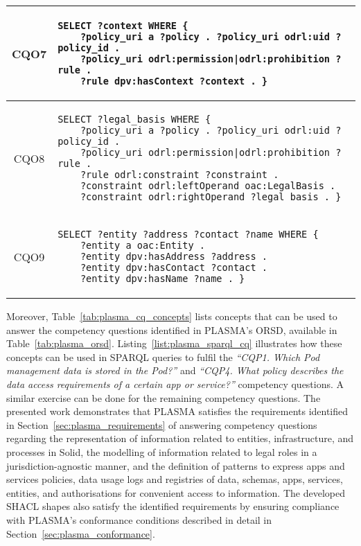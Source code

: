 \begin{table}[htp]
\begin{tabular}{c||l}
        CQO7 & \begin{lstlisting}[numbers=none]
SELECT ?context WHERE {
    ?policy_uri a ?policy . ?policy_uri odrl:uid ?policy_id . 
    ?policy_uri odrl:permission|odrl:prohibition ?rule .
    ?rule dpv:hasContext ?context . } \end{lstlisting} \\
        \hline
        CQO8 & \begin{lstlisting}[numbers=none]
SELECT ?legal_basis WHERE {
    ?policy_uri a ?policy . ?policy_uri odrl:uid ?policy_id . 
    ?policy_uri odrl:permission|odrl:prohibition ?rule .
    ?rule odrl:constraint ?constraint . 
    ?constraint odrl:leftOperand oac:LegalBasis .
    ?constraint odrl:rightOperand ?legal_basis . } \end{lstlisting} \\
        \hline
        CQO9 & \begin{lstlisting}[numbers=none]
SELECT ?entity ?address ?contact ?name WHERE {
    ?entity a oac:Entity . 
    ?entity dpv:hasAddress ?address . 
    ?entity dpv:hasContact ?contact .
    ?entity dpv:hasName ?name . } \end{lstlisting} \\
    \end{tabular}
\end{table}

Moreover, Table~\ref{tab:plasma_cq_concepts} lists concepts that can be used to answer the competency questions identified in PLASMA's ORSD, available in Table~\ref{tab:plasma_orsd}.
Listing~\ref{list:plasma_sparql_cq} illustrates how these concepts can be used in SPARQL queries to fulfil the \textit{``CQP1. Which Pod management data is stored in the Pod?''} and \textit{``CQP4. What policy describes the data access requirements of a certain app or service?''} competency questions.
A similar exercise can be done for the remaining competency questions.
The presented work demonstrates that PLASMA satisfies the requirements identified in Section~\ref{sec:plasma_requirements} of answering competency questions regarding the representation of information related to entities, infrastructure, and processes in Solid, the modelling of information related to legal roles in a jurisdiction-agnostic manner, and the definition of patterns to express apps and services policies, data usage logs and registries of data, schemas, apps, services, entities, and authorisations for convenient access to information.
The developed SHACL shapes also satisfy the identified requirements by ensuring compliance with PLASMA's conformance conditions described in detail in Section~\ref{sec:plasma_conformance}.

